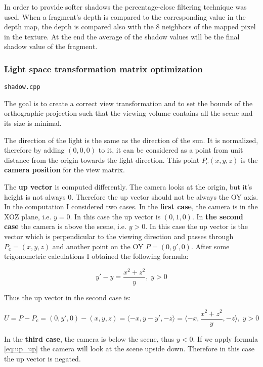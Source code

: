 In order to provide softer shadows the percentage-close filtering technique \cite{learnopengl} was used. When a fragment's depth is compared to the corresponding value in the depth map, the depth is compared also with the 8 neighbors of the mapped pixel in the texture. At the end the average of the shadow values will be the final shadow value of the fragment.

\subsubsection{Light space transformation matrix optimization}

\verb|shadow.cpp|

The goal is to create a correct view transformation and to set the bounds of the orthographic projection such that the viewing volume contains all the scene and its size is minimal.

The direction of the light is the same as the direction of the sun. It is normalized, therefore by adding $(0,0,0)$ to it, it can be considered as a point from unit distance from the origin towards the light direction. This point $P_c(x, y, z)$ is the \textbf{camera position} for the view matrix.

The \textbf{up vector} is computed differently. The camera looks at the origin, but it's height is not always 0. Therefore the up vector should not be always the OY axis. In the computation I considered two cases. In the \textbf{first case}, the camera is in the XOZ plane, i.e. $y = 0$. In this case the up vector is $(0, 1, 0)$. In \textbf{the second case} the camera is above the scene, i.e. $y > 0$. In this case the up vector is the vector which is perpendicular to the viewing direction and passes through $P_c = (x, y, z)$ and another point on the OY $P = (0, y', 0)$. After some trigonometric calculations I obtained the following formula:

\begin{equation}
 y' - y = \frac{x^2 + z^2}{y},\; y > 0
\end{equation}

Thus the up vector in the second case is:

\begin{equation}
\label{eq:up_up}
U       = P - P_c 
        = (0, y', 0) - (x, y, z) 
        = \langle-x, y - y', -z\rangle
        = \langle-x, \frac{x^2 + z^2}{y}, -z\rangle
,\; y > 0
\end{equation}

In the \textbf{third case}, the camera is below the scene, thus $y < 0$. If we apply formula \ref{eq:up_up} the camera will look at the scene upside down. Therefore in this case the up vector is negated.

